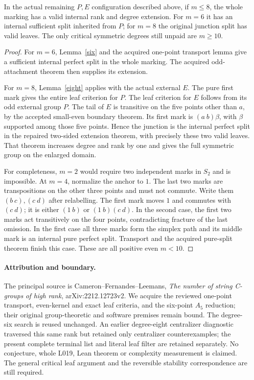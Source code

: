 \documentclass[11pt,a4paper]{article}
\begin{document}
\begin{theorem}
In the actual remaining $P,E$ configuration described above, if
$m\le8$, the whole marking has a valid internal rank and degree
extension. For $m=6$ it has an internal sufficient split inherited
from $P$; for $m=8$ the original junction split has valid leaves.
The only critical symmetric degrees still unpaid are $m\ge10$.
\end{theorem}
\begin{proof}
For $m=6$, Lemma~\ref{six} and the acquired one-point transport
lemma give a sufficient internal perfect split in the whole marking.
The acquired odd-attachment theorem then supplies its extension.

For $m=8$, Lemma~\ref{eight} applies with the actual external $E$.
The pure first mark gives the entire leaf criterion for $P$.
The leaf criterion for $E$ follows from its odd external group $P$.
The tail of $E$ is transitive on the five points other than $a$,
by the accepted small-even boundary theorem. Its first mark is
$(a\ b)\beta$, with $\beta$ supported among those five points.
Hence the junction is the internal perfect split in the repaired
two-sided extension theorem, with precisely these two valid leaves.
That theorem increases degree and rank by one and gives the full
symmetric group on the enlarged domain.

For completeness, $m=2$ would require two independent marks in
$S_2$ and is impossible. At $m=4$, normalize the anchor to $1$.
The last two marks are transpositions on the other three points
and must not commute. Write them $(b\ c),(c\ d)$ after relabelling.
The first mark moves $1$ and commutes with $(c\ d)$; it is either
$(1\ b)$ or $(1\ b)(c\ d)$. In the second case, the first two
marks act transitively on the four points, contradicting fracture
of the last omission. In the first case all three marks form the
simplex path and its middle mark is an internal pure perfect split.
Transport and the acquired pure-split theorem finish this case.
These are all positive even $m<10$.
\end{proof}

\paragraph{Attribution and boundary.}
The principal source is Cameron--Fernandes--Leemans,
\emph{The number of string C-groups of high rank},
arXiv:2212.12723v2. We acquire the reviewed one-point transport,
even-kernel and exact leaf criteria, and the six-point $A_5$
reduction; their original group-theoretic and software premises
remain bound. The degree-six search is reused unchanged. An earlier
degree-eight centralizer diagnostic traversed this same rank but
retained only centralizer counterexamples; the present complete
terminal list and literal leaf filter are retained separately.
No conjecture, whole L019, Lean theorem or complexity measurement
is claimed. The general critical leaf argument and the reversible
stability correspondence are still required.
\end{document}
